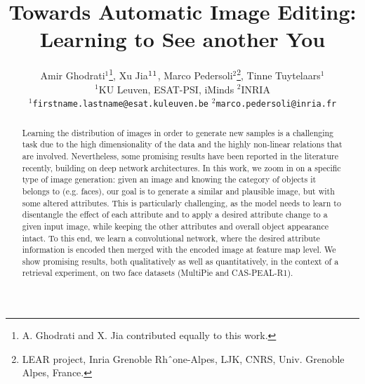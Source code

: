 \documentclass[10pt,twocolumn,letterpaper]{article}
\begin{document}
\title{Towards Automatic Image Editing: Learning to See another You}

\author{Amir Ghodrati$^{1}$\thanks{A. Ghodrati and X. Jia contributed equally to this work.},
Xu Jia$^{1}\footnotemark[1]$, Marco Pedersoli$^2$\thanks{LEAR project, Inria Grenoble Rhˆone-Alpes, LJK, CNRS, Univ. Grenoble Alpes, France.}, Tinne Tuytelaars$^1$ \\
$^{1}$KU Leuven, ESAT-PSI, iMinds \qquad  $^{2}$INRIA \\
$^{1}${\tt\small firstname.lastname@esat.kuleuven.be} \quad $^{2}${\tt\small marco.pedersoli@inria.fr}\\
}

\maketitle

\begin{abstract}
Learning the distribution of images in order to generate new samples 
is a challenging task due to the high dimensionality of the data and 
the highly non-linear relations that are involved.
Nevertheless, some promising results have been reported in the literature recently,
building on deep network architectures.
In this work, we zoom in on a specific type of image generation: 
given an image and knowing the category of objects it belongs to (e.g. faces), 
our goal is to generate a similar and plausible image, but with some altered attributes.
This is particularly challenging, as the model needs to learn to disentangle
the effect of each attribute and to apply a desired attribute change to a given input image, while keeping the other attributes and overall object appearance intact.
To this end, we learn a convolutional network, where the desired attribute information
is encoded then merged with the encoded image at feature map level.
We show promising results, both qualitatively as well as quantitatively, in the context of a retrieval experiment, on two face datasets (MultiPie and CAS-PEAL-R1).
\end{abstract}

\end{document}
